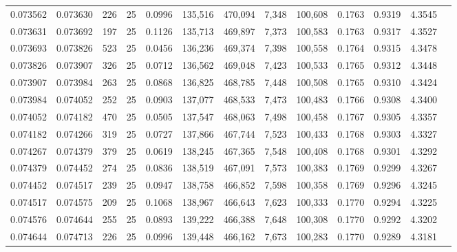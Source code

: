 \begin{tabular}{rrrrrrrrrrrrr}
0.073562 & 0.073630 &   226 &  25 &                                     0.0996 & 135,516 & 470,094 &   7,348 & 100,608 & 0.1763 & 0.9319 & 4.3545 \\
0.073631 & 0.073692 &   197 &  25 &                                     0.1126 & 135,713 & 469,897 &   7,373 & 100,583 & 0.1763 & 0.9317 & 4.3527 \\
0.073693 & 0.073826 &   523 &  25 &                                     0.0456 & 136,236 & 469,374 &   7,398 & 100,558 & 0.1764 & 0.9315 & 4.3478 \\
0.073826 & 0.073907 &   326 &  25 &                                     0.0712 & 136,562 & 469,048 &   7,423 & 100,533 & 0.1765 & 0.9312 & 4.3448 \\
0.073907 & 0.073984 &   263 &  25 &                                     0.0868 & 136,825 & 468,785 &   7,448 & 100,508 & 0.1765 & 0.9310 & 4.3424 \\
0.073984 & 0.074052 &   252 &  25 &                                     0.0903 & 137,077 & 468,533 &   7,473 & 100,483 & 0.1766 & 0.9308 & 4.3400 \\
0.074052 & 0.074182 &   470 &  25 &                                     0.0505 & 137,547 & 468,063 &   7,498 & 100,458 & 0.1767 & 0.9305 & 4.3357 \\
0.074182 & 0.074266 &   319 &  25 &                                     0.0727 & 137,866 & 467,744 &   7,523 & 100,433 & 0.1768 & 0.9303 & 4.3327 \\
0.074267 & 0.074379 &   379 &  25 &                                     0.0619 & 138,245 & 467,365 &   7,548 & 100,408 & 0.1768 & 0.9301 & 4.3292 \\
0.074379 & 0.074452 &   274 &  25 &                                     0.0836 & 138,519 & 467,091 &   7,573 & 100,383 & 0.1769 & 0.9299 & 4.3267 \\
0.074452 & 0.074517 &   239 &  25 &                                     0.0947 & 138,758 & 466,852 &   7,598 & 100,358 & 0.1769 & 0.9296 & 4.3245 \\
0.074517 & 0.074575 &   209 &  25 &                                     0.1068 & 138,967 & 466,643 &   7,623 & 100,333 & 0.1770 & 0.9294 & 4.3225 \\
0.074576 & 0.074644 &   255 &  25 &                                     0.0893 & 139,222 & 466,388 &   7,648 & 100,308 & 0.1770 & 0.9292 & 4.3202 \\
0.074644 & 0.074713 &   226 &  25 &                                     0.0996 & 139,448 & 466,162 &   7,673 & 100,283 & 0.1770 & 0.9289 & 4.3181 \\

\end{tabular}
